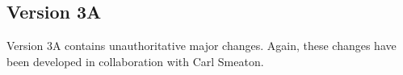 \documentclass[10pt]{report}
\newcommand{\itemtag}[1]{\item \textbf{Change: #1.}\par}
\begin{document}
\begin{itemize}

\end{itemize}

\subsection{Version 3A}

Version 3A contains unauthoritative major changes. Again, these changes have been developed in collaboration with Carl Smeaton.
\end{document}
